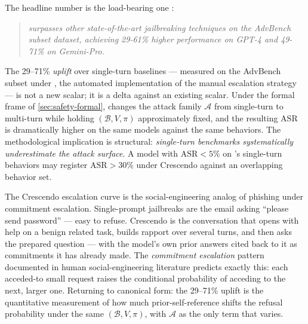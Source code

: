 The headline number is the load-bearing one
\citep[\S{}abstract]{russinovich2024-crescendo}:

\begin{quote}\itshape
{} surpasses other state-of-the-art jailbreaking
techniques on the AdvBench subset dataset, achieving 29-61\%
higher performance on GPT-4 and 49-71\% on Gemini-Pro.
\end{quote}

The 29--71\%  \emph{uplift} over single-turn baselines ---
measured on the AdvBench subset  under , the automated
implementation of the manual escalation strategy --- is not a new
 scalar; it is a delta against an existing  scalar. Under
the formal frame of \cref{sec:safety-formal}, 
changes the attack family $\mathcal{A}$ from single-turn to
multi-turn while holding $(\mathcal{B}, V, \pi)$ approximately
fixed, and the resulting $\mathrm{ASR}$ is dramatically higher on
the same models against the same behaviors. The methodological
implication is structural: \emph{single-turn benchmarks
systematically underestimate the attack surface}. A model with
$\mathrm{ASR} < 5\%$ on 's single-turn behaviors may
register $\mathrm{ASR} > 30\%$ under Crescendo against an
overlapping behavior set.

\begin{analogy}
The Crescendo escalation curve is the social-engineering analog of
phishing under commitment escalation. Single-prompt jailbreaks are
the email asking ``please send password'' --- easy to refuse.
Crescendo is the conversation that opens with help on a benign
related task, builds rapport over several turns, and then asks the
prepared question --- with the model's own prior answers cited
back to it as commitments it has already made. The
\emph{commitment escalation} pattern documented in human
social-engineering literature predicts exactly this: each
acceded-to small request raises the conditional probability of
acceding to the next, larger one. Returning to canonical form: the
29--71\%  uplift is the quantitative measurement of how much
prior-self-reference shifts the refusal probability under the same
$(\mathcal{B}, V, \pi)$, with $\mathcal{A}$ as the only term that
varies.
\end{analogy}

